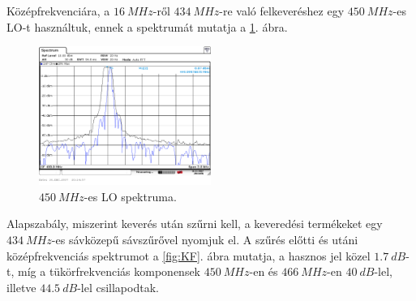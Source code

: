 Középfrekvenciára, a $\SI{16}{MHz}$-ről $\SI{434}{MHz}$-re való felkeveréshez egy $\SI{450}{MHz}$-es LO-t használtuk, ennek a spektrumát mutatja a \ref{fig:LO_450}. ábra.

\begin{figure}[H]
	\centering
	\includegraphics[width=0.5\textwidth,keepaspectratio]{kepek/A_csop_009.PNG}
	\caption{$\SI{450}{MHz}$-es LO spektruma.}
	\label{fig:LO_450}
\end{figure}

Alapszabály, miszerint keverés után szűrni kell, a keveredési termékeket egy $\SI{434}{MHz}$-es sávközepű sávszűrővel nyomjuk el. A szűrés előtti és utáni középfrekvenciás spektrumot a \ref{fig:KF}. ábra mutatja, a hasznos jel közel $\SI{1.7}{dB}$-t, míg a tükörfrekvenciás komponensek $\SI{450}{MHz}$-en és $\SI{466}{MHz}$-en $\SI{40}{dB}$-lel, illetve $\SI{44.5}{dB}$-lel csillapodtak.

